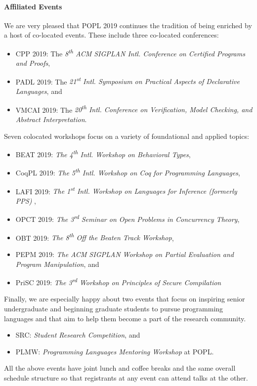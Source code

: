 \paragraph{Affiliated Events}
%
We are very pleased that POPL 2019 continues the tradition of being enriched
by a host of co-located events.
%
These include three co-located conferences:
%
\begin{itemize}
  \item CPP 2019:   The \emph{8\textsuperscript{th} ACM SIGPLAN Intl. Conference on Certified Programs and Proofs},
  \item PADL 2019:  The \emph{21\textsuperscript{st} Intl. Symposium on Practical Aspects of Declarative Languages}, and
  \item VMCAI 2019: The \emph{20\textsuperscript{th} Intl. Conference on Verification, Model Checking, and Abstract Interpretation}.
\end{itemize}
%
Seven colocated workshops focus on a variety of foundational and applied topics:
%
\begin{itemize}
  \item BEAT 2019: \emph{The 4\textsuperscript{th} Intl. Workshop on Behavioral Types},
  \item CoqPL 2019: \emph{The 5\textsuperscript{th} Intl. Workshop on Coq for Programming Languages},
  \item LAFI 2019: \emph{The 1\textsuperscript{st} Intl. Workshop on Languages for Inference (formerly PPS) },
  \item OPCT 2019:   \emph{The 3\textsuperscript{rd} Seminar on Open Problems in Concurrency Theory},
  \item OBT 2019:   \emph{The 8\textsuperscript{th} Off the Beaten Track Workshop},
  \item PEPM 2019:  \emph{The ACM SIGPLAN Workshop on Partial Evaluation and Program Manipulation}, and
  \item PriSC 2019: \emph{The 3\textsuperscript{rd} Workshop on Principles of Secure Compilation}
\end{itemize}
%
Finally, we are especially happy about two events that
focus on inspiring senior undergraduate and beginning
graduate students to pursue programming languages and
that aim to help them become a part of the research
community.
%
\begin{itemize}
\item SRC: \emph{Student Research Competition}, and
\item PLMW: \emph{Programming Languages Mentoring Workshop} at POPL.
\end{itemize}
%
All the above events have joint lunch and coffee breaks
and the same overall schedule structure so that registrants
at any event can attend talks at the other.

